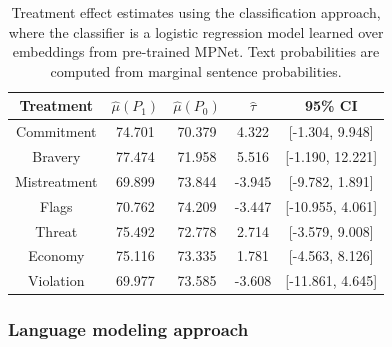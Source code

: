 \documentclass{article}
\newcommand{\vl}[1]{\textcolor{orange}{[VL: #1]}}
\begin{document}
\begin{table}[!ht]
    \centering
    \begin{tabular}{c|cccc}
        \toprule
        Treatment & $\hat{\mu}(P_1)$ & $\hat{\mu}(P_0)$ & $\hat{\tau}$ & 95\% CI \\
        \midrule
        Commitment & 74.701 & 70.379 & \textcolor{green!50!black}{4.322} & [-1.304, 9.948] \\
        Bravery & 77.474 & 71.958 & \textcolor{green!50!black}{5.516} & [-1.190, 12.221] \\
        Mistreatment & 69.899 & 73.844 & \textcolor{red!80!black}{-3.945} & [-9.782, 1.891] \\
        Flags & 70.762 & 74.209 & \textcolor{red!80!black}{-3.447} & [-10.955, 4.061] \\
        Threat & 75.492 & 72.778 & \textcolor{green!50!black}{2.714} & [-3.579, 9.008] \\
        Economy & 75.116 & 73.335 & \textcolor{green!50!black}{1.781} & [-4.563, 8.126] \\
        Violation & 69.977 & 73.585 & \textcolor{red!80!black}{-3.608} & [-11.861, 4.645] \\
        \bottomrule
    \end{tabular}
    \caption{Treatment effect estimates using the classification approach, where the classifier is a logistic regression model learned over embeddings from pre-trained MPNet. Text probabilities are computed from marginal sentence probabilities.}
    \label{tab:results_clf2}
\end{table}



\subsubsection{Language modeling approach}
\end{document}
